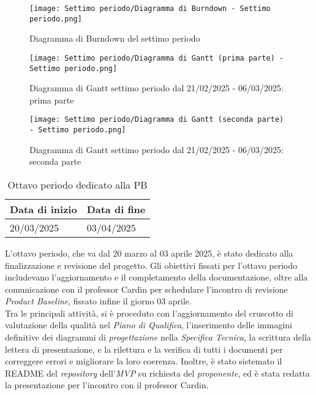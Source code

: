 \newpage
\begin{figure}[h] 
    \centering
    \texttt{[image: Settimo periodo/Diagramma di Burndown - Settimo periodo.png]}
    \caption{Diagramma di Burndown del settimo periodo} 
    \label{fig: Diagramma di Burndown del settimo periodo}
\end{figure}
\newpage
\begin{figure}[h] 
    \centering
    \texttt{[image: Settimo periodo/Diagramma di Gantt (prima parte) - Settimo periodo.png]}
    \caption{Diagramma di Gantt settimo periodo dal 21/02/2025 - 06/03/2025: prima parte} 
    \label{fig: Diagramma di Gantt settimo periodo dal 21/02/2025 - 06/03/2025: prima parte}
\end{figure}
\newpage
\begin{figure}[h] 
    \centering
    \texttt{[image: Settimo periodo/Diagramma di Gantt (seconda parte) - Settimo periodo.png]}
    \caption{Diagramma di Gantt settimo periodo dal 21/02/2025 - 06/03/2025: seconda parte} 
    \label{fig: Diagramma di Gantt settimo periodo dal 21/02/2025 - 06/03/2025: seconda parte}
\end{figure}

\newpage
{}
\label{sec:ottavo periodo}
\begin{table}[h!]
    \centering
    \renewcommand{\arraystretch}{1.5} %
    \begin{tabularx}{\textwidth}{|X|X|}\hline
    \rowcolor[HTML]{FFD700} 
    \textbf{Data di inizio} & \textbf{Data di fine} \\ \hline
    20/03/2025 & 03/04/2025 \\ \hline
    \end{tabularx}
    \caption{Ottavo periodo dedicato alla PB}
\end{table}
L'ottavo periodo, che va dal 20 marzo al 03 aprile 2025, è stato dedicato alla finalizzazione e revisione del progetto. Gli obiettivi fissati per l'ottavo periodo includevano l'aggiornamento e il completamento della documentazione, oltre alla comunicazione con il professor Cardin per schedulare l'incontro di revisione \emph{Product Baseline}, fissato infine il giorno 03 aprile.\\
Tra le principali attività, si è proceduto con l'aggiornamento del cruscotto di valutazione della qualità nel \emph{Piano di Qualifica}, l'inserimento delle immagini definitive dei diagrammi di \emph{progettazione} nella \emph{Specifica Tecnica}, la scrittura della lettera di presentazione, e la rilettura e la verifica di tutti i documenti per correggere errori e migliorare la loro coerenza. Inoltre, è stato sistemato il README del \emph{repository} dell’\emph{MVP} su richiesta del \emph{proponente}, ed è stata redatta la presentazione per l’incontro con il professor Cardin.

